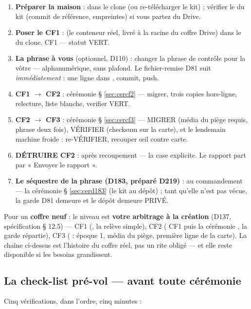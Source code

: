 \begin{enumerate}
\item \textbf{Préparer la maison} :  dans le clone (ou re-télécharger
le kit) ; vérifier le  du kit (commit de référence, empreintes)
si vous partez du Drive.
\item \textbf{Poser le CF1} :  (le conteneur réel, livré à la
racine du coffre Drive) dans le  du clone. CF1 — statut
VERT.
\item \textbf{La phrase à vous} (optionnel, D110) : changer la phrase de contrôle
pour la vôtre — alphanumérique, sans plafond. Le fichier-remise D81 suit
\emph{immédiatement} : une ligne dans , commit, push.
\item \textbf{CF1 $\to$ CF2} : cérémonie § \ref{sec:cercf2} — migrer, trois copies
hors-ligne, relecture, liste blanche, verifier VERT.
\item \textbf{CF2 $\to$ CF3} : cérémonie § \ref{sec:cercf3} — MIGRER (média du piège
requis, phrase deux fois), VÉRIFIER (checksum sur la carte), et le lendemain machine
froide : re-VÉRIFIER, recouper œil contre carte.
\item \textbf{DÉTRUIRE CF2} : après recoupement — la case explicite. Le rapport
part par « Envoyer le rapport ».
\item \textbf{Le séquestre de la phrase (D183, préparé D219)} : au
commandement — la cérémonie § \ref{sec:cerd183} (le kit au dépôt) ; tant
qu'elle n'est pas vécue, la garde D81 demeure et le dépôt demeure PRIVÉ.
\end{enumerate}

Pour un \textbf{coffre neuf} : le niveau est \textbf{votre arbitrage à la création}
(D137, spécification § 12.5) — CF1 (, la relève simple),
CF2 ( CF1 puis la cérémonie , la garde
répartie), CF3 ( : époque 1, média du piège, première
ligne de la carte). La chaîne ci-dessus est l'histoire du coffre réel, pas un rite
obligé — et elle reste disponible si les besoins grandissent.

\subsection{La check-list pré-vol — avant toute cérémonie}\label{sec:preflight}

Cinq vérifications, dans l'ordre, cinq minutes :

